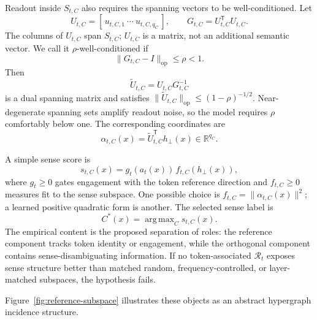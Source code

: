 \documentclass[
  aps,
  reprint,
  superscriptaddress,
  floatfix,
  nofootinbib,
  longbibliography
]{revtex4-2}
\newcommand{\R}{\mathbb{R}}
\newcommand{\T}{^{\mathsf{T}}}
\newcommand{\opnorm}[1]{\lVert #1 \rVert_{\mathrm{op}}}
\newcommand{\norm}[1]{\lVert #1 \rVert}
\DeclareMathOperator*{\argmax}{arg\,max}
\begin{document}
Readout inside $S_{t,C}$ also requires the spanning vectors to be
well-conditioned. Let
%
\begin{equation}
U_{t,C}=[\,u_{t,C,1}\ \cdots\ u_{t,C,q_C}\,],
\qquad
G_{t,C}=U_{t,C}\T U_{t,C}.
\end{equation}
%
The columns of $U_{t,C}$ span $S_{t,C}$; $U_{t,C}$ is a matrix, not an
additional semantic vector. We call it $\rho$-well-conditioned if
%
\begin{equation}
\label{eq:rho-stable}
\opnorm{G_{t,C}-I}\le\rho<1.
\end{equation}
%
Then
%
\begin{equation}
\label{eq:dual-spanning}
\widetilde U_{t,C}=U_{t,C}G_{t,C}^{-1}
\end{equation}
%
is a dual spanning matrix and satisfies
$\opnorm{\widetilde U_{t,C}}\le(1-\rho)^{-1/2}$. Near-degenerate spanning
sets amplify readout noise, so the model requires $\rho$ comfortably below
one. The corresponding coordinates are
%
\begin{equation}
\label{eq:alpha}
\alpha_{t,C}(x)=\widetilde U_{t,C}\T h_\perp(x)
\in\R^{q_C}.
\end{equation}
%

A simple sense score is
%
\begin{equation}
\label{eq:sense-score}
s_{t,C}(x)=g_t(a_t(x))\,f_{t,C}(h_\perp(x)),
\end{equation}
%
where $g_t\ge0$ gates engagement with the token reference direction and
$f_{t,C}\ge0$ measures fit to the sense subspace. One possible choice is
$f_{t,C}=\norm{\alpha_{t,C}(x)}^2$; a learned positive quadratic form is
another. The selected sense label is
%
\begin{equation}
\label{eq:selected-sense}
C^*(x)=\argmax_C s_{t,C}(x).
\end{equation}
%
The empirical content is the proposed separation of roles: the reference
component tracks token identity or engagement, while the orthogonal
component contains sense-disambiguating information. If no token-associated
$\mathcal R_t$ exposes sense structure better than matched random,
frequency-controlled, or layer-matched subspaces, the hypothesis fails.

Figure~\ref{fig:reference-subspace} illustrates these objects as an abstract
hypergraph incidence structure.
\end{document}
